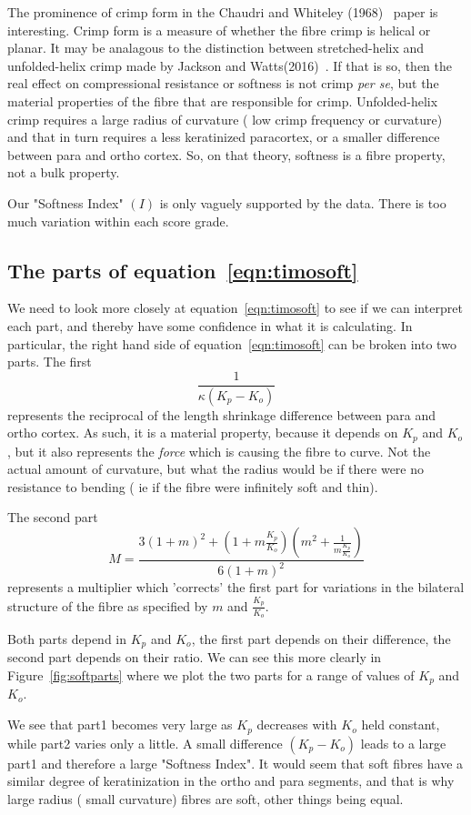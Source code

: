 \documentclass[titlepage]{article}  %
\begin{document}
The prominence of crimp form in the Chaudri and Whiteley (1968)~\cite{chau:68} paper is interesting. Crimp form is a measure of whether the fibre crimp is helical or planar.  It may be analagous to the distinction between stretched-helix and unfolded-helix crimp made by Jackson and Watts(2016)~\cite{jack:16}. If that is so, then the real effect on compressional resistance or softness is not crimp {\em per se}, but the material properties of the fibre that are responsible for crimp. Unfolded-helix crimp requires a large radius of curvature ( low crimp frequency or curvature) and that in turn requires a less keratinized paracortex, or a smaller difference between para and ortho cortex. So, on that theory, softness is a fibre property, not a bulk property.

Our "Softness Index" $(I)$ is only vaguely supported by the data. There is too much variation within each score grade.

\subsection{The parts of equation~\ref{eqn:timosoft}}
We need to look more closely at equation~\ref{eqn:timosoft} to see if we can interpret each part, and thereby have some confidence in what it is calculating. In particular, the right hand side of equation~\ref{eqn:timosoft} can be broken into two parts. The first
\begin{displaymath}
\frac{1}{\kappa(K_{p} - K_{o})}
\end{displaymath}
represents the reciprocal of the length shrinkage difference between para and ortho cortex. As such, it is a material property, because it depends on $K_{p}$ and $K_{o}$, but it also represents the {\em force} which is causing the fibre to curve.   Not the actual amount of curvature, but what the radius would be if there were no resistance to bending ( ie if the fibre were infinitely soft and thin).

The second part 
\begin{displaymath}
 M = \frac{ 3(1+m)^{2}+(1+m \frac{K_{p}}{K_{o}})(m^{2}+\frac{1}{m \frac{K_{p}}{K_{o}}})} {6(1+m)^{2}}
\end{displaymath}
represents a multiplier which 'corrects' the first part for variations in the bilateral structure of the fibre as specified by $m$ and $\frac{K_{p}}{K_{o}}$. 

Both parts depend in $K_{p}$ and $K_{o}$, the first part depends on their difference, the second part depends on their ratio. We can see this more clearly in Figure~\ref{fig:softparts} where we plot the two parts for a range of values of $K_{p}$ and $K_{o}$.

We see that part1 becomes very large as $K_{p}$ decreases with $K_{o}$ held constant, while part2 varies only a little. A small difference $(K_{p} - K_{o})$ leads to a large part1 and therefore a large "Softness Index".  It would seem that soft fibres have a similar degree of keratinization in the ortho and para segments, and that is why large radius ( small curvature) fibres are soft, other things being equal.
\end{document}
